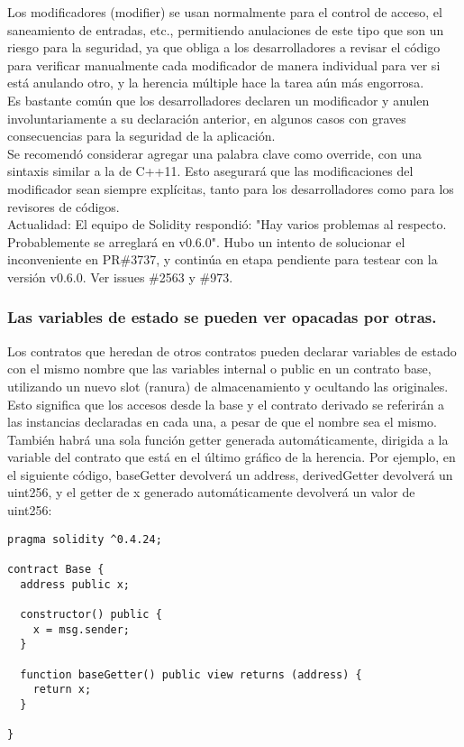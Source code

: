 Los modificadores (modifier) se usan normalmente para el control de acceso, el saneamiento de entradas, etc., permitiendo anulaciones de este tipo que son un riesgo para la seguridad, ya que obliga a los desarrolladores a revisar el código para verificar manualmente cada modificador de manera individual para ver si está anulando otro, y la herencia múltiple hace la tarea aún más engorrosa.\\

Es bastante común que los desarrolladores declaren un modificador y anulen involuntariamente a su declaración anterior, en algunos casos con graves consecuencias para la seguridad de la aplicación.\\

Se recomendó considerar agregar una palabra clave como override, con una sintaxis similar a la de C++11. Esto asegurará que las modificaciones del modificador sean siempre explícitas, tanto para los desarrolladores como para los revisores de códigos.\\

Actualidad: El equipo de Solidity respondió: "Hay varios problemas al respecto. Probablemente se arreglará en v0.6.0". Hubo un intento de solucionar el inconveniente en PR\#3737, y continúa en etapa pendiente para testear con la versión v0.6.0. Ver issues \#2563 y \#973.

\subsubsection{Las variables de estado se pueden ver opacadas por otras.}

Los contratos que heredan de otros contratos pueden declarar variables de estado con el mismo nombre que las variables internal o public en un contrato base, utilizando un nuevo slot (ranura) de almacenamiento y ocultando las originales. Esto significa que los accesos desde la base y el contrato derivado se referirán a las instancias declaradas en cada una, a pesar de que el nombre sea el mismo. También habrá una sola función getter generada automáticamente, dirigida a la variable del contrato que está en el último gráfico de la herencia. Por ejemplo, en el siguiente código, baseGetter devolverá un address, derivedGetter devolverá un uint256, y el getter de x generado automáticamente devolverá un valor de uint256:

\begin{lstlisting}[language=Solidity]
pragma solidity ^0.4.24;

contract Base {
  address public x;

  constructor() public {
    x = msg.sender;
  }

  function baseGetter() public view returns (address) {
    return x;
  }

}
\end{lstlisting}

